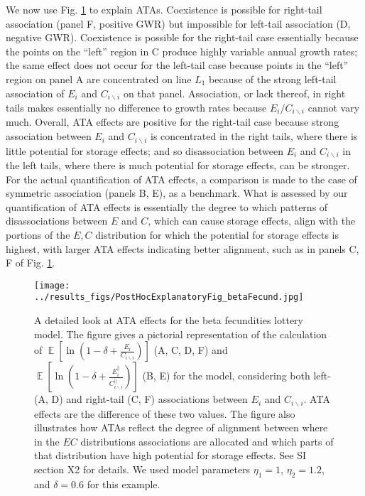 \documentclass[letterpaper,11pt]{article}
\DeclareMathOperator{\E}{\mathbb{E}}%
\newcommand{\bs}{\backslash}
\begin{document}
We now use Fig. \ref{fig:beta_fecundidities_explanatory} to explain ATAs. Coexistence is possible for 
right-tail association (panel F, positive GWR) but impossible for left-tail association (D,
negative GWR). Coexistence is possible for the right-tail case essentially
because the points on the ``left'' region in C produce highly variable
annual growth rates; the same effect does not occur for the left-tail case because 
points in the ``left'' region on panel A are concentrated on line $L_1$ because of the
strong left-tail association of $E_i$ and $C_{i \bs i}$ on that panel. 
Association, or lack thereof, in right tails makes essentially no difference 
to growth rates because $E_i/C_{i \bs i}$ cannot vary much. Overall, ATA effects 
are positive for the right-tail case because strong association between 
$E_i$ and $C_{i \bs i}$ is concentrated in the right tails, where there 
is little potential for storage effects; and so disassociation between
$E_i$ and $C_{i \bs i}$ in the left tails, where there is much potential for
storage effects, can be stronger. For the actual quantification of ATA effects,
a comparison is made to the case of symmetric association 
(panels B, E), as a benchmark. What is assessed by our quantification of ATA
effects is essentially the degree to which patterns of disassociations between 
$E$ and $C$, which can cause storage effects, align with the portions of 
the $E,C$ distribution for which the potential for storage effects is highest,
with larger ATA effects indicating better alignment, such as in panels C, F
of Fig. \ref{fig:beta_fecundidities_explanatory}.







\begin{figure}
\texttt{[image: ../results\_figs/PostHocExplanatoryFig\_betaFecund.jpg]}
\caption{A detailed look at ATA effects for the beta fecundities lottery model.
The figure gives a pictorial representation of the calculation of  
$\E \left[ \ln \left( 1-\delta+\frac{E_i}{C_{i \bs i}} \right) \right]$ (A, C, D, F) and 
$\E \left[ \ln \left( 1-\delta+\frac{E_i^{||}}{C_{i \bs i}^{||}} \right) \right]$ (B, E)
for the model, considering both left- (A, D) and right-tail (C, F) associations
between $E_i$ and $C_{i \bs i}$. ATA effects are the difference of these two values.
The figure also illustrates how ATAs reflect the degree of alignment between where 
in the $EC$ distributions associations are allocated and which parts of that distribution
have high potential for storage effects. See SI section X2
for details. We used model parameters $\eta_1 = 1$, $\eta_2 = 1.2$, and $\delta=0.6$
for this example.}\label{fig:beta_fecundidities_explanatory}
\end{figure}




\end{document}
